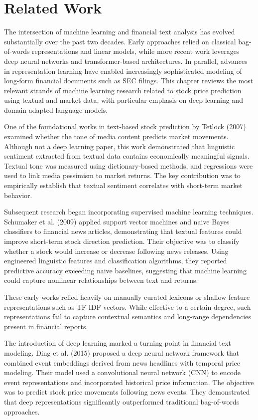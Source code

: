 \chapter{Related Work}

The intersection of machine learning and financial text analysis has evolved substantially over the past two decades. Early approaches relied on classical bag-of-words representations and linear models, while more recent work leverages deep neural networks and transformer-based architectures. In parallel, advances in representation learning have enabled increasingly sophisticated modeling of long-form financial documents such as SEC filings. This chapter reviews the most relevant strands of machine learning research related to stock price prediction using textual and market data, with particular emphasis on deep learning and domain-adapted language models.

One of the foundational works in text-based stock prediction by Tetlock (2007)\cite{tetlock2007giving} examined whether the tone of media content predicts market movements. Although not a deep learning paper, this work demonstrated that linguistic sentiment extracted from textual data contains economically meaningful signals. Textual tone was measured using dictionary-based methods, and regressions were used to link media pessimism to market returns. The key contribution was to empirically establish that textual sentiment correlates with short-term market behavior.

Subsequent research began incorporating supervised machine learning techniques. Schumaker et al. (2009)\cite{schumaker2009textual} applied support vector machines and naive Bayes classifiers to financial news articles, demonstrating that textual features could improve short-term stock direction prediction. Their objective was to classify whether a stock would increase or decrease following news releases. Using engineered linguistic features and classification algorithms, they reported predictive accuracy exceeding naive baselines, suggesting that machine learning could capture nonlinear relationships between text and returns.

These early works relied heavily on manually curated lexicons or shallow feature representations such as TF-IDF vectors. While effective to a certain degree, such representations fail to capture contextual semantics and long-range dependencies present in financial reports.


The introduction of deep learning marked a turning point in financial text modeling. Ding et al. (2015)\cite{ding2015deep} proposed a deep neural network framework that combined event embeddings derived from news headlines with temporal price modeling. Their model used a convolutional neural network (CNN) to encode event representations and incorporated historical price information. The objective was to predict stock price movements following news events. They demonstrated that deep representations significantly outperformed traditional bag-of-words approaches.

